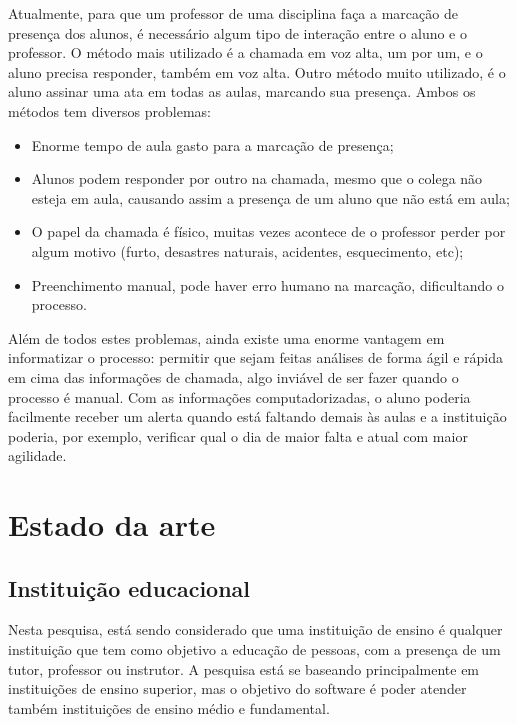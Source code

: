 \documentclass[
	12pt,
	oneside,
	a4paper,
	english,
	brazil,
]{abntex2}
\begin{document}
Atualmente, para que um professor de uma disciplina faça a marcação de presença dos alunos, é necessário algum tipo de interação entre o aluno e o professor. O método mais utilizado é a chamada em voz alta, um por um, e o aluno precisa responder, também em voz alta. Outro método muito utilizado, é o aluno assinar uma ata em todas as aulas, marcando sua presença. Ambos os métodos tem diversos problemas:

\begin{itemize}
    \item Enorme tempo de aula gasto para a marcação de presença;
    \item Alunos podem responder por outro na chamada, mesmo que o colega não esteja em aula, causando assim a presença de um aluno que não está em aula;
    \item O papel da chamada é físico, muitas vezes acontece de o professor perder por algum motivo (furto, desastres naturais, acidentes, esquecimento, etc);
    \item Preenchimento manual, pode haver erro humano na marcação, dificultando o processo.
\end{itemize}

Além de todos estes problemas, ainda existe uma enorme vantagem em informatizar o processo: permitir que sejam feitas análises de forma ágil e rápida em cima das informações de chamada, algo inviável de ser fazer quando o processo é manual. Com as informações computadorizadas, o aluno poderia facilmente receber um alerta quando está faltando demais às aulas e a instituição poderia, por exemplo, verificar qual o dia de maior falta e atual com maior agilidade.



\chapter{Estado da arte}

\section{Instituição educacional}

Nesta pesquisa, está sendo considerado que uma instituição de ensino é qualquer instituição que tem como objetivo a educação de pessoas, com a presença de um tutor, professor ou instrutor. A pesquisa está se baseando principalmente em instituições de ensino superior, mas o objetivo do software é poder atender também instituições de ensino médio e fundamental.
\end{document}
